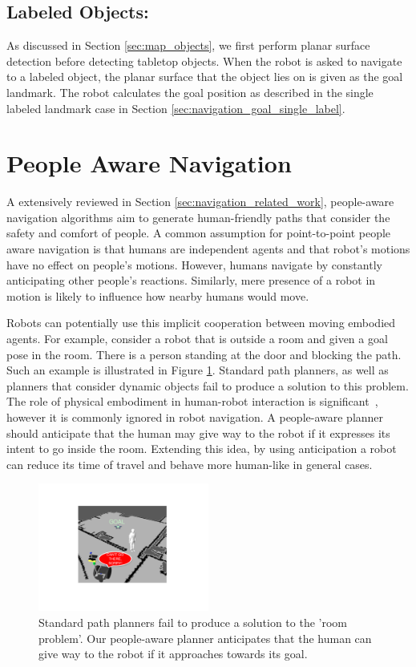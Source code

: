 \subsection{Labeled Objects:} As discussed in Section \ref{sec:map_objects}, we first perform planar surface detection before detecting tabletop objects. When the robot is asked to navigate to a labeled object, the planar surface that the object lies on is given as the goal landmark. The robot calculates the goal position as described in the single labeled landmark case in Section \ref{sec:navigation_goal_single_label}.

\section{People Aware Navigation}
\label{sec:navigation_people_aware_navigation}

A extensively reviewed in Section \ref{sec:navigation_related_work}, people-aware navigation algorithms aim to generate human-friendly paths that consider the safety and comfort of people. A common assumption for point-to-point people aware navigation is that humans are independent agents and that robot's motions have no effect on people's motions. However, humans navigate by constantly anticipating other people's reactions. Similarly, mere presence of a robot in motion is likely to influence how nearby humans would move. 

Robots can potentially use this implicit cooperation between moving embodied agents. For example, consider a robot that is outside a room and given a goal pose in the room. There is a person standing at the door and blocking the path. Such an example is illustrated in Figure \ref{fig:room}. Standard path planners, as well as planners that consider dynamic objects fail to produce a solution to this problem. The role of physical embodiment in human-robot interaction is significant~\cite{wainer2006role}, however it is commonly ignored in robot navigation. A people-aware planner should anticipate that the human may give way to the robot if it expresses its intent to go inside the room. Extending this idea, by using anticipation a robot can reduce its time of travel and behave more human-like in general cases.

\begin{figure}[t!]
\centering
\includegraphics[width=0.5\textwidth]{pics/room_crop}
\caption{Standard path planners fail to produce a solution to the 'room problem'. Our people-aware planner anticipates that the human can give way to the robot if it approaches towards its goal.}
\label{fig:room}
\end{figure}

